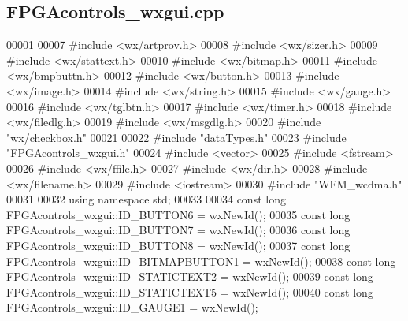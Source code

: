 \subsection{F\+P\+G\+Acontrols\+\_\+wxgui.\+cpp}
\label{FPGAcontrols__wxgui_8cpp_source}

\begin{DoxyCode}
00001 
00007 \textcolor{preprocessor}{#include <wx/artprov.h>}
00008 \textcolor{preprocessor}{#include <wx/sizer.h>}
00009 \textcolor{preprocessor}{#include <wx/stattext.h>}
00010 \textcolor{preprocessor}{#include <wx/bitmap.h>}
00011 \textcolor{preprocessor}{#include <wx/bmpbuttn.h>}
00012 \textcolor{preprocessor}{#include <wx/button.h>}
00013 \textcolor{preprocessor}{#include <wx/image.h>}
00014 \textcolor{preprocessor}{#include <wx/string.h>}
00015 \textcolor{preprocessor}{#include <wx/gauge.h>}
00016 \textcolor{preprocessor}{#include <wx/tglbtn.h>}
00017 \textcolor{preprocessor}{#include <wx/timer.h>}
00018 \textcolor{preprocessor}{#include <wx/filedlg.h>}
00019 \textcolor{preprocessor}{#include <wx/msgdlg.h>}
00020 \textcolor{preprocessor}{#include "wx/checkbox.h"}
00021 
00022 \textcolor{preprocessor}{#include "dataTypes.h"}
00023 \textcolor{preprocessor}{#include "FPGAcontrols_wxgui.h"}
00024 \textcolor{preprocessor}{#include <vector>}
00025 \textcolor{preprocessor}{#include <fstream>}
00026 \textcolor{preprocessor}{#include <wx/ffile.h>}
00027 \textcolor{preprocessor}{#include <wx/dir.h>}
00028 \textcolor{preprocessor}{#include <wx/filename.h>}
00029 \textcolor{preprocessor}{#include <iostream>}
00030 \textcolor{preprocessor}{#include "WFM_wcdma.h"}
00031 
00032 \textcolor{keyword}{using namespace }std;
00033 
00034 \textcolor{keyword}{const} \textcolor{keywordtype}{long} FPGAcontrols_wxgui::ID_BUTTON6 = wxNewId();
00035 \textcolor{keyword}{const} \textcolor{keywordtype}{long} FPGAcontrols_wxgui::ID_BUTTON7 = wxNewId();
00036 \textcolor{keyword}{const} \textcolor{keywordtype}{long} FPGAcontrols_wxgui::ID_BUTTON8 = wxNewId();
00037 \textcolor{keyword}{const} \textcolor{keywordtype}{long} FPGAcontrols_wxgui::ID_BITMAPBUTTON1 = wxNewId();
00038 \textcolor{keyword}{const} \textcolor{keywordtype}{long} FPGAcontrols_wxgui::ID_STATICTEXT2 = wxNewId();
00039 \textcolor{keyword}{const} \textcolor{keywordtype}{long} FPGAcontrols_wxgui::ID_STATICTEXT5 = wxNewId();
00040 \textcolor{keyword}{const} \textcolor{keywordtype}{long} FPGAcontrols_wxgui::ID_GAUGE1 = wxNewId();

\end{DoxyCode}
